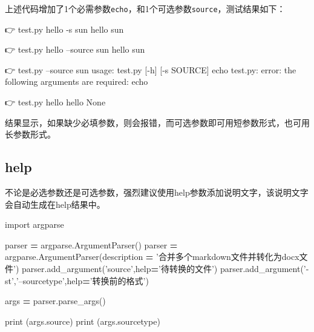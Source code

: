 \documentclass[]{ctexbook}
\newenvironment{Shaded}{\begin{snugshade}}{\end{snugshade}}
\newcommand{\BuiltInTok}[1]{#1}
\newcommand{\ExtensionTok}[1]{#1}
\newcommand{\ImportTok}[1]{#1}
\newcommand{\NormalTok}[1]{#1}
\newcommand{\OperatorTok}[1]{\textcolor[rgb]{0.81,0.36,0.00}{\textbf{#1}}}
\newcommand{\StringTok}[1]{\textcolor[rgb]{0.31,0.60,0.02}{#1}}
\begin{document}
上述代码增加了1个必需参数\texttt{echo}，和1个可选参数\texttt{source}，测试结果如下：

\begin{Shaded}
\begin{Highlighting}[]
\NormalTok{👉  }\ExtensionTok{test.py}\NormalTok{ hello -s sun}
\ExtensionTok{hello}
\ExtensionTok{sun}

\NormalTok{👉  }\ExtensionTok{test.py}\NormalTok{ hello --source sun}
\ExtensionTok{hello}
\ExtensionTok{sun}

\NormalTok{ 👉  }\ExtensionTok{test.py}\NormalTok{ --source sun}
\ExtensionTok{usage}\NormalTok{: test.py [-h] [-s SOURCE] echo}
\ExtensionTok{test.py}\NormalTok{: error: the following arguments are required: echo}

\NormalTok{ 👉  }\ExtensionTok{test.py}\NormalTok{ hello}
\ExtensionTok{hello}
\ExtensionTok{None}
\end{Highlighting}
\end{Shaded}

结果显示，如果缺少必填参数，则会报错，而可选参数即可用短参数形式，也可用长参数形式。

\hypertarget{help}{%
\subsection{help}\label{help}}

不论是必选参数还是可选参数，强烈建议使用help参数添加说明文字，该说明文字会自动生成在help结果中。

\begin{Shaded}
\begin{Highlighting}[]
\ImportTok{import}\NormalTok{ argparse}

\NormalTok{parser }\OperatorTok{=}\NormalTok{ argparse.ArgumentParser()}
\NormalTok{parser }\OperatorTok{=}\NormalTok{ argparse.ArgumentParser(description }\OperatorTok{=} \StringTok{'合并多个markdown文件并转化为docx文件'}\NormalTok{)}
\NormalTok{parser.add_argument(}\StringTok{'source'}\NormalTok{,}\BuiltInTok{help}\OperatorTok{=}\StringTok{'待转换的文件'}\NormalTok{)}
\NormalTok{parser.add_argument(}\StringTok{'-st'}\NormalTok{,}\StringTok{'--sourcetype'}\NormalTok{,}\BuiltInTok{help}\OperatorTok{=}\StringTok{'转换前的格式'}\NormalTok{)}

\NormalTok{args }\OperatorTok{=}\NormalTok{ parser.parse_args()}

\BuiltInTok{print}\NormalTok{ (args.source)}
\BuiltInTok{print}\NormalTok{ (args.sourcetype)}
\end{Highlighting}
\end{Shaded}
\end{document}
